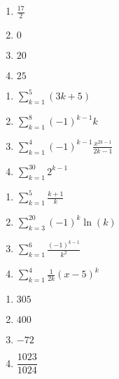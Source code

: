 \documentclass{ximera}
\begin{document}
\begin{multicols}{4} 
\begin{enumerate}
\setcounter{enumi}{\value{HW}}


\item $\frac{17}{2}$
\item $0$
\item  $20$
\item  $25$

\setcounter{HW}{\value{enumi}}
\end{enumerate}
\end{multicols}


\begin{multicols}{4} 
\begin{enumerate}
\setcounter{enumi}{\value{HW}}

\item $\displaystyle \sum_{k = 1}^{5} (3k + 5)$
\item $\displaystyle \sum_{k = 1}^{8} (-1)^{k - 1}k$
\item $\displaystyle \sum_{k = 1}^{4} (-1)^{k - 1} \frac{x^{2k - 1}}{2k - 1}$
\item $\displaystyle \sum_{k = 1}^{30} 2^{k-1}$

\setcounter{HW}{\value{enumi}}
\end{enumerate}
\end{multicols}


\begin{multicols}{4} 
\begin{enumerate}
\setcounter{enumi}{\value{HW}}


\item $\displaystyle \sum_{k = 1}^{5} \frac{k + 1}{k}$
\item $\displaystyle \sum_{k = 3}^{20} (-1)^{k} \ln(k)$
\item $\displaystyle \sum_{k = 1}^{6} \frac{(-1)^{k - 1}}{k^{2}}$
\item $\displaystyle \sum_{k = 1}^{4} \frac{1}{2k}(x - 5)^{k}$

\setcounter{HW}{\value{enumi}}
\end{enumerate}
\end{multicols}


\begin{multicols}{4} 
\begin{enumerate}
\setcounter{enumi}{\value{HW}}

\item $305$

\item  $400$

\item  $-72$

\item $\dfrac{1023}{1024}$

\setcounter{HW}{\value{enumi}}
\end{enumerate}
\end{multicols}
\end{document}
